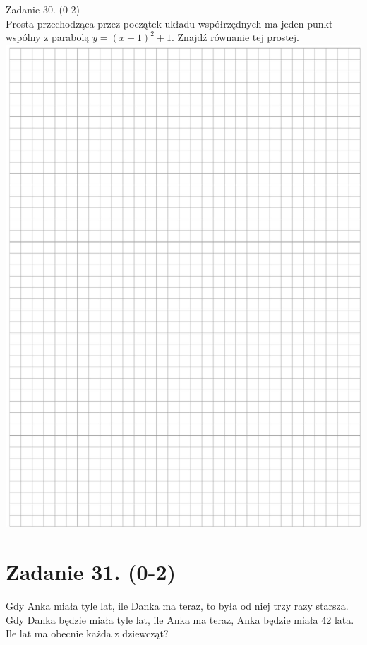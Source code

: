 \documentclass[10pt]{article}
\begin{document}
Zadanie 30. (0-2)\\
Prosta przechodząca przez początek układu współrzędnych ma jeden punkt wspólny z parabolą \(y=(x-1)^{2}+1\). Znajdź równanie tej prostej.\\
\includegraphics[max width=\textwidth, center]{2024_11_21_99eb8e6624b497a5af43g-14}

\section*{Zadanie 31. (0-2)}
Gdy Anka miała tyle lat, ile Danka ma teraz, to była od niej trzy razy starsza. Gdy Danka będzie miała tyle lat, ile Anka ma teraz, Anka będzie miała 42 lata. Ile lat ma obecnie każda z dziewcząt?
\end{document}
